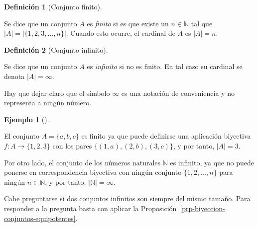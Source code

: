 \documentclass[
  a4paper,
]{scrreport}
\theoremstyle{definition}
\newtheorem{example}{Ejemplo}[chapter]
\theoremstyle{plain}
\theoremstyle{definition}
\newtheorem{definition}{Definición}[chapter]
\theoremstyle{definition}
\theoremstyle{plain}
\theoremstyle{plain}
\theoremstyle{remark}
\begin{document}
\begin{definition}[Conjunto
finito]\protect\hypertarget{def-conjunto-finito}{}\label{def-conjunto-finito}

Se dice que un conjunto \(A\) es \emph{finito} si es que existe un
\(n\in\mathbb{N}\) tal que \(|A| = |\{1,2,3,\ldots,n \}|\). Cuando esto
ocurre, el cardinal de \(A\) es \(|A|=n\).

\end{definition}

\begin{definition}[Conjunto
infinito]\protect\hypertarget{def-conjunto-infinito}{}\label{def-conjunto-infinito}

Se dice que un conjunto \(A\) es \emph{infinito} si no es finito. En tal
caso su cardinal se denota \(|A|=\infty\).

\end{definition}

\begin{tcolorbox}[enhanced jigsaw, leftrule=.75mm, colbacktitle=quarto-callout-warning-color!10!white, toprule=.15mm, opacityback=0, opacitybacktitle=0.6, toptitle=1mm, breakable, bottomtitle=1mm, colframe=quarto-callout-warning-color-frame, rightrule=.15mm, titlerule=0mm, title=\textcolor{quarto-callout-warning-color}{\faExclamationTriangle}\hspace{0.5em}{Advertencia}, arc=.35mm, left=2mm, bottomrule=.15mm, colback=white, coltitle=black]

Hay que dejar claro que el símbolo \(\infty\) es una notación de
conveniencia y no representa a ningún número.

\end{tcolorbox}

\begin{example}[]\protect\hypertarget{exm-conjunto-finito-infinito}{}\label{exm-conjunto-finito-infinito}

El conjunto \(A=\{a, b, c\}\) es finito ya que puede definirse una
aplicación biyectiva \(f:A\rightarrow \{1, 2, 3\}\) con los pares
\(\{(1,a),(2,b), (3,c)\}\), y por tanto, \(|A| = 3\).

Por otro lado, el conjunto de los números naturales \(\mathbb{N}\) es
infinito, ya que no puede ponerse en correspondencia biyectiva con
ningún conjunto \(\{1,2,\ldots,n\}\) para ningún \(n\in\mathbb{N}\), y
por tanto, \(|\mathbb{N}|=\infty\).

\end{example}

Cabe preguntarse si dos conjuntos infinitos son siempre del mismo
tamaño. Para responder a la pregunta basta con aplicar la
Proposición~\ref{prp-biyeccion-conjuntos-equipotentes}.
\end{document}
